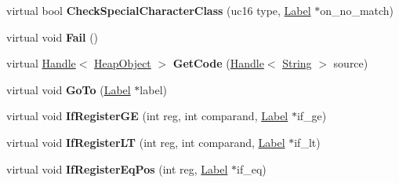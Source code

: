 \begin{DoxyCompactItemize}
\item 
virtual bool {\bfseries Check\+Special\+Character\+Class} (uc16 type, \hyperlink{classv8_1_1internal_1_1_label}{Label} $\ast$on\+\_\+no\+\_\+match)\hypertarget{classv8_1_1internal_1_1_reg_exp_macro_assembler_m_i_p_s_ab455a5dc7bd22448fc80389f65da6ba4}{}\label{classv8_1_1internal_1_1_reg_exp_macro_assembler_m_i_p_s_ab455a5dc7bd22448fc80389f65da6ba4}

\item 
virtual void {\bfseries Fail} ()\hypertarget{classv8_1_1internal_1_1_reg_exp_macro_assembler_m_i_p_s_a1f76644b73922fdb7c85d35a97619a27}{}\label{classv8_1_1internal_1_1_reg_exp_macro_assembler_m_i_p_s_a1f76644b73922fdb7c85d35a97619a27}

\item 
virtual \hyperlink{classv8_1_1internal_1_1_handle}{Handle}$<$ \hyperlink{classv8_1_1internal_1_1_heap_object}{Heap\+Object} $>$ {\bfseries Get\+Code} (\hyperlink{classv8_1_1internal_1_1_handle}{Handle}$<$ \hyperlink{classv8_1_1internal_1_1_string}{String} $>$ source)\hypertarget{classv8_1_1internal_1_1_reg_exp_macro_assembler_m_i_p_s_aba2c29cf034a6057a363765aaf98575f}{}\label{classv8_1_1internal_1_1_reg_exp_macro_assembler_m_i_p_s_aba2c29cf034a6057a363765aaf98575f}

\item 
virtual void {\bfseries Go\+To} (\hyperlink{classv8_1_1internal_1_1_label}{Label} $\ast$label)\hypertarget{classv8_1_1internal_1_1_reg_exp_macro_assembler_m_i_p_s_a9deb59afa79ec7813e0d374f31e040fe}{}\label{classv8_1_1internal_1_1_reg_exp_macro_assembler_m_i_p_s_a9deb59afa79ec7813e0d374f31e040fe}

\item 
virtual void {\bfseries If\+Register\+GE} (int reg, int comparand, \hyperlink{classv8_1_1internal_1_1_label}{Label} $\ast$if\+\_\+ge)\hypertarget{classv8_1_1internal_1_1_reg_exp_macro_assembler_m_i_p_s_a60ec4b978d9eeed5efc3c844e5c7e635}{}\label{classv8_1_1internal_1_1_reg_exp_macro_assembler_m_i_p_s_a60ec4b978d9eeed5efc3c844e5c7e635}

\item 
virtual void {\bfseries If\+Register\+LT} (int reg, int comparand, \hyperlink{classv8_1_1internal_1_1_label}{Label} $\ast$if\+\_\+lt)\hypertarget{classv8_1_1internal_1_1_reg_exp_macro_assembler_m_i_p_s_a6950a9e308d016babca7b9cda491715a}{}\label{classv8_1_1internal_1_1_reg_exp_macro_assembler_m_i_p_s_a6950a9e308d016babca7b9cda491715a}

\item 
virtual void {\bfseries If\+Register\+Eq\+Pos} (int reg, \hyperlink{classv8_1_1internal_1_1_label}{Label} $\ast$if\+\_\+eq)\hypertarget{classv8_1_1internal_1_1_reg_exp_macro_assembler_m_i_p_s_aac49a601b2823be3b741ab6179abe937}{}\label{classv8_1_1internal_1_1_reg_exp_macro_assembler_m_i_p_s_aac49a601b2823be3b741ab6179abe937}


\end{DoxyCompactItemize}
